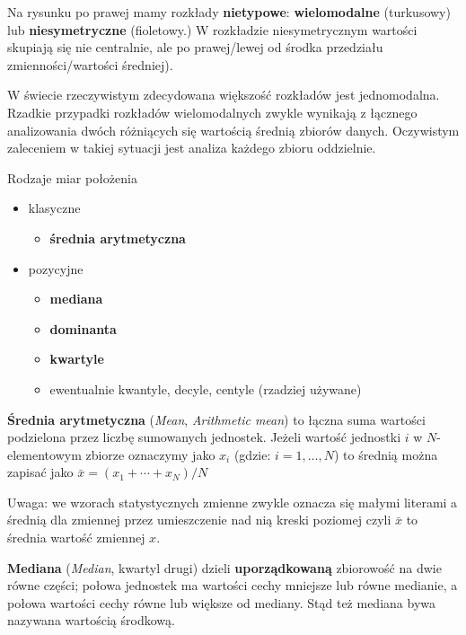 \documentclass[
  openany]{book}
\providecommand{\tightlist}{%
  \setlength{\itemsep}{0pt}\setlength{\parskip}{0pt}}
\begin{document}
Na rysunku po prawej mamy rozkłady \textbf{nietypowe}: \textbf{wielomodalne} (turkusowy)
lub \textbf{niesymetryczne} (fioletowy.) W rozkładzie niesymetrycznym wartości skupiają się nie centralnie,
ale po prawej/lewej od środka przedziału zmienności/wartości średniej).

W świecie rzeczywistym zdecydowana większość rozkładów jest jednomodalna.
Rzadkie przypadki rozkładów wielomodalnych zwykle wynikają z łącznego analizowania
dwóch różniących się wartością średnią zbiorów danych.
Oczywistym zaleceniem w takiej sytuacji jest analiza każdego zbioru oddzielnie.

Rodzaje miar położenia

\begin{itemize}
\tightlist
\item
  klasyczne

  \begin{itemize}
  \tightlist
  \item
    \textbf{średnia arytmetyczna}
  \end{itemize}
\item
  pozycyjne

  \begin{itemize}
  \tightlist
  \item
    \textbf{mediana}
  \item
    \textbf{dominanta}
  \item
    \textbf{kwartyle}
  \item
    ewentualnie kwantyle, decyle, centyle (rzadziej używane)
  \end{itemize}
\end{itemize}

\textbf{Średnia arytmetyczna} (\emph{Mean}, \emph{Arithmetic mean}) to łączna suma
wartości podzielona przez liczbę sumowanych jednostek. Jeżeli
wartość jednostki \(i\) w \(N\)-elementowym zbiorze oznaczymy
jako \(x_i\) (gdzie: \(i=1,\ldots,N\)) to
średnią można zapisać jako \(\bar x = (x_1 + \cdots + x_N)/N\)

Uwaga: we wzorach statystycznych zmienne zwykle oznacza się małymi literami
a średnią dla zmiennej przez umieszczenie nad nią kreski poziomej czyli
\(\bar x\) to średnia wartość zmiennej \(x\).

\textbf{Mediana} (\emph{Median}, kwartyl drugi) dzieli \textbf{uporządkowaną} zbiorowość na dwie równe części;
połowa jednostek ma wartości cechy mniejsze lub równe medianie, a połowa
wartości cechy równe lub większe od mediany.
Stąd też mediana bywa nazywana wartością środkową.
\end{document}
